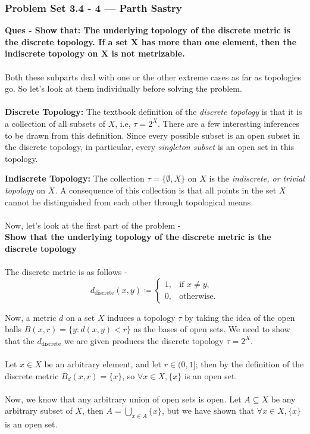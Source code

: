 
\begin{frame}
    \frametitle{Problem Set 3.4 - 4 --- Parth Sastry}
    \textbf{Ques - Show that: The underlying topology of the discrete metric is the discrete topology. If a set X has more than one element, then the indiscrete topology on X is not metrizable.}\\\\
    Both these subparts deal with one or the other extreme cases as far as topologies go. So let's look at them individually before solving the problem.\\\\
    \pause
    \textbf{Discrete Topology:} The textbook definition of the \textit{discrete topology} is that it is a collection of all subsets of $X$, i.e, $\tau = 2^{X}$. There are a few interesting inferences to be drawn from this definition. Since every possible subset is an open subset in the discrete topology, in particular, every \textit{singleton subset} is an open set in this topology.
\end{frame}

\begin{frame}
    \textbf{Indiscrete Topology:} The collection $\tau = \{ \emptyset , X \}$ on $X$ is the \textit{indiscrete, or trivial topology} on $X$. A consequence of this collection is that all points in the set $X$ cannot be distinguished from each other through topological means.\\\\
    Now, let's look at the first part of the problem - \\
    \pause
    \textbf{Show that the underlying topology of the discrete metric is the discrete topology} \\\\
    \pause
    The discrete metric is as follows - \\
    \[
        d_{\text{discrete}}(x,y) \coloneqq 
        \begin{cases}
            1, & \text{if } x \neq y, \\
            0, & \text{otherwise}.
        \end{cases}
    \]
\end{frame}

\begin{frame}
    Now, a metric $d$ on a set $X$ induces a topology $\tau$ by taking the idea of the open balls $B(x,r) = \{y : d(x,y) < r\}$ as the bases of open sets. We need to show that the $d_{\text{discrete}}$ we are given produces the discrete topology $\tau = 2^{X}$.\\\\
    \pause
    Let $x \in X$ be an arbitrary element, and let $r \in (0, 1]$; then by the definition of the discrete metric $B_d(x,r) = \{x\}$, so $\forall x \in X, \{x\}$ is an open set.\\\\
    \pause
    Now, we know that any arbitrary union of open sets is open. Let $A \subseteq X$ be any arbitrary subset of $X$, then $A = \bigcup_{x \in A} \{x\}$, but we have shown that $\forall x \in X, \{x\}$ is an open set.
\end{frame}

